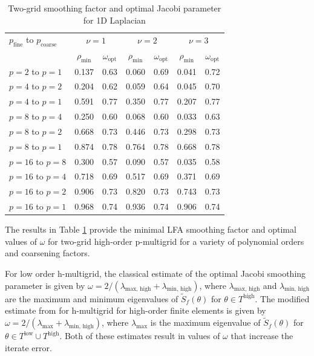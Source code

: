 \documentclass[review]{siamart190516}
\begin{document}
\begin{table}[ht!]
\begin{center}
\begin{tabular}{l cc cc cc}
  \toprule
  $p_{\text{fine}}$ to $p_{\text{coarse}}$  &  \multicolumn{2}{c}{$\nu = 1$}          &  \multicolumn{2}{c}{$\nu = 2$}          &  \multicolumn{2}{c}{$\nu = 3$}          \\
                                            &  $\rho_{\min}$ & $\omega_{\text{opt}}$  &  $\rho_{\min}$ & $\omega_{\text{opt}}$  &  $\rho_{\min}$ & $\omega_{\text{opt}}$  \\
  \midrule
  $p = 2$ to $p = 1$          &  0.137 & 0.63  &  0.060 & 0.69  &  0.041 & 0.72   \\
  $p = 4$ to $p = 2$          &  0.204 & 0.62  &  0.059 & 0.64  &  0.045 & 0.70   \\
  $p = 4$ to $p = 1$          &  0.591 & 0.77  &  0.350 & 0.77  &  0.207 & 0.77   \\
  $p = 8$ to $p = 4$          &  0.250 & 0.60  &  0.068 & 0.60  &  0.033 & 0.63   \\
  $p = 8$ to $p = 2$          &  0.668 & 0.73  &  0.446 & 0.73  &  0.298 & 0.73   \\
  $p = 8$ to $p = 1$          &  0.874 & 0.78  &  0.764 & 0.78  &  0.668 & 0.78   \\
  $p = 16$ to $p = 8$         &  0.300 & 0.57  &  0.090 & 0.57  &  0.035 & 0.58   \\
  $p = 16$ to $p = 4$         &  0.718 & 0.69  &  0.517 & 0.69  &  0.371 & 0.69   \\
  $p = 16$ to $p = 2$         &  0.906 & 0.73  &  0.820 & 0.73  &  0.743 & 0.73   \\
  $p = 16$ to $p = 1$         &  0.968 & 0.74  &  0.936 & 0.74  &  0.906 & 0.74   \\
  \bottomrule
\end{tabular}
\end{center}
\caption{Two-grid smoothing factor and optimal Jacobi parameter for 1D Laplacian}
\label{table:two_grid_1d}
\end{table}

The results in Table \ref{table:two_grid_1d} provide the minimal LFA smoothing factor and optimal values of $\omega$ for two-grid high-order p-multigrid for a variety of polynomial orders and coarsening factors.

For low order h-multigrid, the classical estimate of the optimal Jacobi smoothing parameter is given by $\omega = 2 / \left( \lambda_{\text{max, high}} + \lambda_{\text{min, high}} \right)$, where $\lambda_{\text{max, high}}$ and $\lambda_{\text{min, high}}$ are the maximum and minimum eigenvalues of $\tilde{S}_f \left( \theta \right)$ for $\theta \in T^{\text{high}}$.
The modified estimate from \cite{he2020two} for h-multigrid for high-order finite elements is given by $\omega = 2 / \left( \lambda_{\text{max}} + \lambda_{\text{min, high}} \right)$, where $\lambda_{\text{max}}$ is the maximum eigenvalue of $\tilde{S}_f \left( \theta \right)$ for $\theta \in T^{\text{low}} \cup T^{\text{high}}$.
Both of these estimates result in values of $\omega$ that increase the iterate error.
\end{document}
